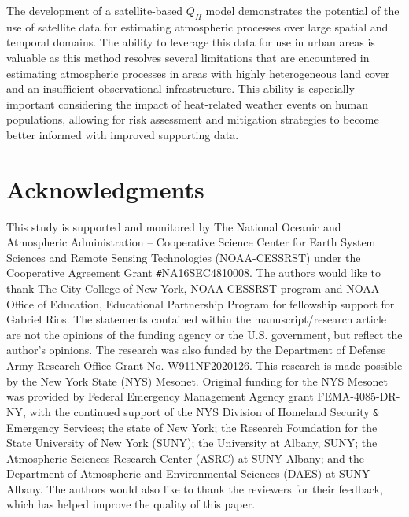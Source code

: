 The development of a satellite-based $Q_H$ model demonstrates the potential of the use of satellite data for estimating atmospheric processes over large spatial and temporal domains. The ability to leverage this data for use in urban areas is valuable as this method resolves several limitations that are encountered in estimating atmospheric processes in areas with highly heterogeneous land cover and an insufficient observational infrastructure. This ability is especially important considering the impact of heat-related weather events on human populations, allowing for risk assessment and mitigation strategies to become better informed with improved supporting data.


\section*{Acknowledgments}

This study is supported and monitored by The National Oceanic and Atmospheric Administration – Cooperative Science Center for Earth System Sciences and Remote Sensing Technologies (NOAA-CESSRST) under the Cooperative Agreement Grant \verb|#|NA16SEC4810008. The authors would like to thank The City College of New York, NOAA-CESSRST program and NOAA Office of Education, Educational Partnership Program for fellowship support for Gabriel Rios. The statements contained within the manuscript/research article are not the opinions of the funding agency or the U.S. government, but reflect the author’s opinions. The research was also funded by the Department of Defense Army Research Office Grant No. W911NF2020126. This research is made possible by the New York State (NYS) Mesonet. Original funding for the NYS Mesonet was provided by Federal Emergency Management Agency grant FEMA-4085-DR-NY, with the continued support of the NYS Division of Homeland Security \verb|&| Emergency Services; the state of New York; the Research Foundation for the State University of New York (SUNY); the University at Albany, SUNY; the Atmospheric Sciences Research Center (ASRC) at SUNY Albany; and the Department of Atmospheric and Environmental Sciences (DAES) at SUNY Albany.  The authors would also like to thank the reviewers for their feedback, which has helped improve the quality of this paper. 
